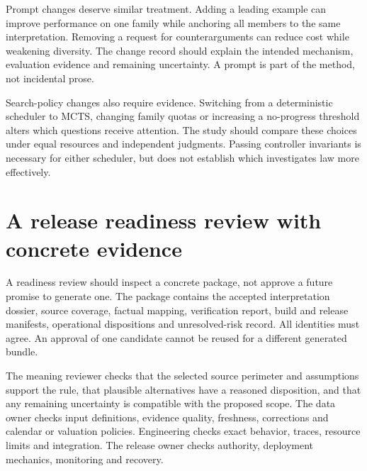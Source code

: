 \documentclass[12pt,a4paper,oneside,openany]{book}
\begin{document}
Prompt changes deserve similar treatment. Adding a leading example can improve
performance on one family while anchoring all members to the same interpretation.
Removing a request for counterarguments can reduce cost while weakening diversity.
The change record should explain the intended mechanism, evaluation evidence and
remaining uncertainty. A prompt is part of the method, not incidental prose.

Search-policy changes also require evidence. Switching from a deterministic
scheduler to MCTS, changing family quotas or increasing a no-progress threshold
alters which questions receive attention. The study should compare these choices
under equal resources and independent judgments. Passing controller invariants
is necessary for either scheduler, but does not establish which investigates law
more effectively.

\section{A release readiness review with concrete evidence}
\label{merge:M10:11}


A readiness review should inspect a concrete package, not approve a future promise
to generate one. The package contains the accepted interpretation dossier, source
coverage, factual mapping, verification report, build and release manifests,
operational dispositions and unresolved-risk record. All identities must agree.
An approval of one candidate cannot be reused for a different generated bundle.

The meaning reviewer checks that the selected source perimeter and assumptions
support the rule, that plausible alternatives have a reasoned disposition, and
that any remaining uncertainty is compatible with the proposed scope. The data
owner checks input definitions, evidence quality, freshness, corrections and
calendar or valuation policies. Engineering checks exact behavior, traces,
resource limits and integration. The release owner checks authority, deployment
mechanics, monitoring and recovery.
\end{document}
